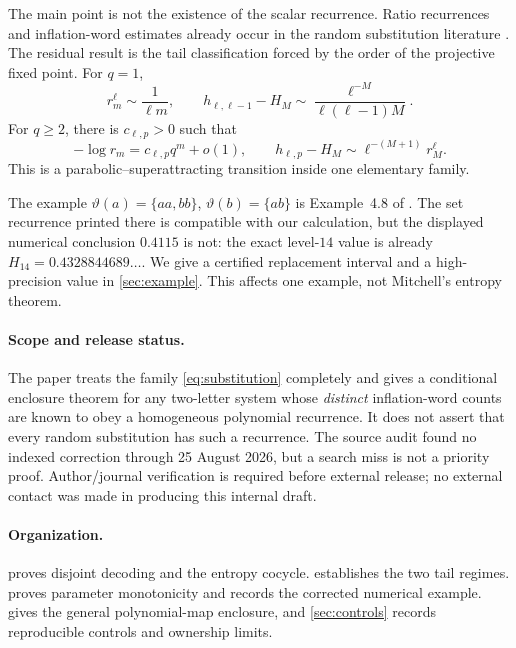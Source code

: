 The main point is not the existence of the scalar recurrence.  Ratio
recurrences and inflation-word estimates already occur in the random
substitution literature \cite{Gohlke2020,GohlkeMitchell2026}.  The residual
result is the tail classification forced by the order of the projective
fixed point.  For $q=1$,
\begin{equation}
 r_m^\ell\sim\frac1{\ell m},\qquad
 h_{\ell,\ell-1}-H_M
 \sim\frac{\ell^{-M}}{\ell(\ell-1)M}.
 \label{eq:parabolic-intro}
\end{equation}
For $q\ge2$, there is $c_{\ell,p}>0$ such that
\begin{equation}
 -\log r_m=c_{\ell,p}q^m+o(1),\qquad
 h_{\ell,p}-H_M\sim\ell^{-(M+1)}r_M^\ell.
 \label{eq:super-intro}
\end{equation}
This is a parabolic--superattracting transition inside one elementary family.

The example $\vartheta(a)=\{aa,bb\}$, $\vartheta(b)=\{ab\}$ is
Example~4.8 of \cite{Mitchell2024}.  The set recurrence printed there is
compatible with our calculation, but the displayed numerical conclusion
$0.4115$ is not: the exact level-$14$ value is already
$H_{14}=0.4328844689\ldots$.  We give a certified replacement interval and a
high-precision value in \cref{sec:example}.  This affects one example, not
Mitchell's entropy theorem.

\paragraph{Scope and release status.}
The paper treats the family \cref{eq:substitution} completely and gives a
conditional enclosure theorem for any two-letter system whose \emph{distinct}
inflation-word counts are known to obey a homogeneous polynomial recurrence.
It does not assert that every random substitution has such a recurrence.
The source audit found no indexed correction through 25 August 2026, but a
search miss is not a priority proof.  Author/journal verification is required
before external release; no external contact was made in producing this
internal draft.

\paragraph{Organization.}
 proves disjoint decoding and the entropy cocycle.
 establishes the two tail regimes.  
proves parameter monotonicity and records the corrected numerical example.
 gives the general polynomial-map enclosure, and
\cref{sec:controls} records reproducible controls and ownership limits.

